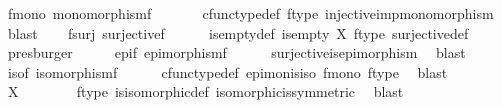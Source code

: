 \begin{isabellebody}
\ f{\isacharunderscore}{\kern0pt}mono{\isacharcolon}{\kern0pt}\ {\isachardoublequoteopen}monomorphism{\isacharparenleft}{\kern0pt}f{\isacharparenright}{\kern0pt}{\isachardoublequoteclose}\isanewline
\ \ \ \ \isamarkupfalse%
\ \ cfunc{\isacharunderscore}{\kern0pt}type{\isacharunderscore}{\kern0pt}def\ f{\isacharunderscore}{\kern0pt}type\ injective{\isacharunderscore}{\kern0pt}imp{\isacharunderscore}{\kern0pt}monomorphism\ \isamarkupfalse%
\ blast\isanewline
\ \ \isamarkupfalse%
\ f{\isacharunderscore}{\kern0pt}surj{\isacharcolon}{\kern0pt}\ {\isachardoublequoteopen}surjective{\isacharparenleft}{\kern0pt}f{\isacharparenright}{\kern0pt}{\isachardoublequoteclose}\isanewline
\ \ \ \ \isamarkupfalse%
\ is{\isacharunderscore}{\kern0pt}empty{\isacharunderscore}{\kern0pt}def\ {\isacartoucheopen}is{\isacharunderscore}{\kern0pt}empty\ X{\isacartoucheclose}\ f{\isacharunderscore}{\kern0pt}type\ surjective{\isacharunderscore}{\kern0pt}def{}\ \isamarkupfalse%
\ presburger\isanewline
\ \ \isamarkupfalse%
\ \isamarkupfalse%
\ epi{\isacharunderscore}{\kern0pt}f{\isacharcolon}{\kern0pt}\ {\isachardoublequoteopen}epimorphism{\isacharparenleft}{\kern0pt}f{\isacharparenright}{\kern0pt}{\isachardoublequoteclose}\isanewline
\ \ \ \ \isamarkupfalse%
\ surjective{\isacharunderscore}{\kern0pt}is{\isacharunderscore}{\kern0pt}epimorphism\ \isamarkupfalse%
\ blast\isanewline
\ \ \isamarkupfalse%
\ \isamarkupfalse%
\ iso{\isacharunderscore}{\kern0pt}f{\isacharcolon}{\kern0pt}\ {\isachardoublequoteopen}isomorphism{\isacharparenleft}{\kern0pt}f{\isacharparenright}{\kern0pt}{\isachardoublequoteclose}\isanewline
\ \ \ \ \isamarkupfalse%
\ cfunc{\isacharunderscore}{\kern0pt}type{\isacharunderscore}{\kern0pt}def\ epi{\isacharunderscore}{\kern0pt}mon{\isacharunderscore}{\kern0pt}is{\isacharunderscore}{\kern0pt}iso\ f{\isacharunderscore}{\kern0pt}mono\ f{\isacharunderscore}{\kern0pt}type\ \isamarkupfalse%
\ blast\isanewline
\ \ \isamarkupfalse%
\ \isamarkupfalse%
\ {\isachardoublequoteopen}X\ {\isasymcong}\ {\isasymemptyset}{\isachardoublequoteclose}\isanewline
\ \ \ \ \isamarkupfalse%
\ f{\isacharunderscore}{\kern0pt}type\ is{\isacharunderscore}{\kern0pt}isomorphic{\isacharunderscore}{\kern0pt}def\ isomorphic{\isacharunderscore}{\kern0pt}is{\isacharunderscore}{\kern0pt}symmetric\ \isamarkupfalse%
\ blast\isanewline

\end{isabellebody}
